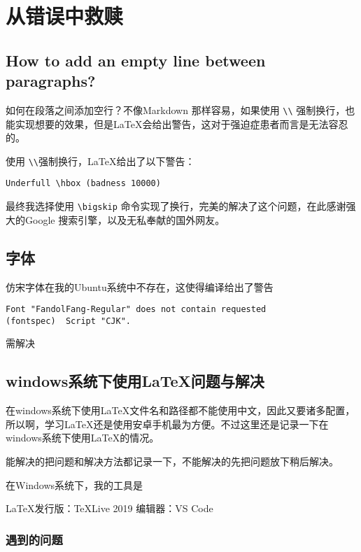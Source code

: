 \chapter{从错误中救赎}

\section[换行]{How to add an empty line between paragraphs?}

如何在段落之间添加空行？不像Markdown 那样容易，如果使用 \verb`\\` 强制换行，也能实现想要的效果，但是\LaTeX 会给出警告，这对于强迫症患者而言是无法容忍的。

使用 \verb`\\`强制换行，\LaTeX 给出了以下警告：
\begin{lstlisting}
Underfull \hbox (badness 10000)
\end{lstlisting}

最终我选择使用 \verb|\bigskip|  命令实现了换行，完美的解决了这个问题，在此感谢强大的Google 搜索引擎，以及无私奉献的国外网友。
\section{字体}

仿宋字体在我的Ubuntu系统中不存在，这使得编译给出了警告
\begin{lstlisting}
Font "FandolFang-Regular" does not contain requested
(fontspec)	Script "CJK".
\end{lstlisting}
需解决

\section{windows系统下使用LaTeX问题与解决}

在windows系统下使用LaTeX文件名和路径都不能使用中文，因此又要诸多配置，所以啊，学习LaTeX还是使用安卓手机最为方便。不过这里还是记录一下在windows系统下使用LaTeX的情况。

能解决的把问题和解决方法都记录一下，不能解决的先把问题放下稍后解决。

在Windows系统下，我的工具是

LaTeX发行版：TeXLive 2019
编辑器：VS Code

\subsection{遇到的问题}
    

